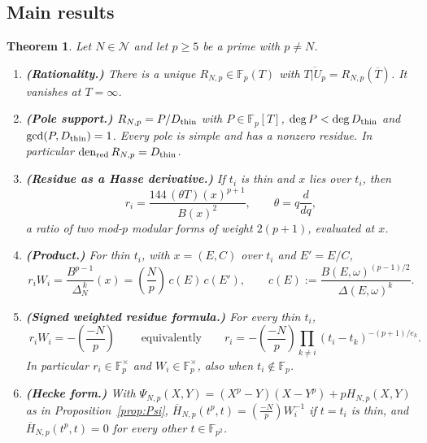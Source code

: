 \documentclass[11pt,a4paper]{article}
\numberwithin{equation}{section}
\newtheorem{maintheorem}[theorem]{Theorem}
\theoremstyle{definition}
\theoremstyle{remark}
\newcommand{\Fp}{\mathbb F_p}
\newcommand{\Fq}{\mathbb F_{p^2}}
\newcommand{\den}{\operatorname{den}_{\mathrm{red}}}
\newcommand{\Lp}[1]{\left(\frac{#1}{p}\right)}
\begin{document}
\subsection{Main results}
\begin{maintheorem}\label{thm:main}
Let $N\in\mathcal N$ and let $p\ge5$ be a prime with $p\ne N$.
\begin{enumerate}[label=\textup{(\alph*)}]
\item \textbf{(Rationality.)} There is a unique $R_{N,p}\in\Fp(T)$ with $\overline{T|U_p}=R_{N,p}(\overline T)$. It vanishes at $T=\infty$.
\item \textbf{(Pole support.)} $R_{N,p}=P/D_{\rm thin}$ with $P\in\Fp[T]$,
$\deg P<\deg D_{\rm thin}$ and $\gcd(P,D_{\rm thin})=1$. Every pole is simple and has a nonzero residue. In particular $\den R_{N,p}=D_{\rm thin}$.
\item \textbf{(Residue as a Hasse derivative.)} If $t_i$ is thin and $x$ lies over $t_i$, then
\[
r_i=\frac{144\,(\theta T)(x)^{p+1}}{B(x)^2},\qquad \theta=q\frac{d}{dq},
\]
a ratio of two mod-$p$ modular forms of weight $2(p+1)$, evaluated at $x$.
\item \textbf{(Product.)} For thin $t_i$, with $x=(E,C)$ over $t_i$ and $E'=E/C$,
\[
r_iW_i=\frac{B^{p-1}}{\Delta_N^{\,k}}(x)=\Lp{N}\,c(E)\,c(E'),\qquad
c(E):=\frac{B(E,\omega)^{(p-1)/2}}{\Delta(E,\omega)^{k}}.
\]
\item \textbf{(Signed weighted residue formula.)} For every thin $t_i$,
\[
\boxed{\;r_iW_i=-\Lp{-N}\;}\qquad\text{equivalently}\qquad
r_i=-\Lp{-N}\prod_{k\ne i}(t_i-t_k)^{-(p+1)/e_k}.
\]
In particular $r_i\in\Fp^\times$ and $W_i\in\Fp^\times$, also when $t_i\notin\Fp$.
\item \textbf{(Hecke form.)} With $\Psi_{N,p}(X,Y)=(X^p-Y)(X-Y^p)+pH_{N,p}(X,Y)$ as in
Proposition~\ref{prop:Psi}, $\overline H_{N,p}(t^p,t)=\Lp{-N}W_i^{-1}$ if $t=t_i$ is thin, and
$\overline H_{N,p}(t^p,t)=0$ for every other $t\in\Fq$.
\end{enumerate}
\end{maintheorem}
\end{document}
